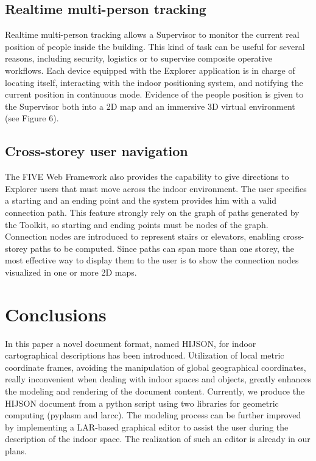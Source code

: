 \documentclass[]{egpubl}
\begin{document}
\subsection{Realtime multi-person tracking} Realtime multi-person tracking
allows a Supervisor to monitor the current real position of people inside the
building. This kind of task can be useful for several reasons, including
security, logistics or to supervise composite operative workflows. Each device
equipped with the Explorer application is in charge of locating itself,
interacting with the indoor positioning system, and notifying the current
position in continuous mode. Evidence of the people position is given to the
Supervisor both into a 2D map and an immersive 3D virtual environment (see
Figure 6).

\subsection{Cross-storey user navigation} The FIVE Web Framework also provides
the capability to give directions to Explorer users that must move across the
indoor environment. The user specifies a starting and an ending point and the
system provides him with a valid connection path. This feature strongly rely
on the graph of paths generated by the Toolkit, so starting and ending points
must be nodes of the graph. Connection nodes are introduced to represent
stairs or elevators, enabling cross-storey paths to be computed. Since paths
can span more than one storey, the most effective way to display them to the
user is to show the connection nodes visualized in one or more 2D maps.


\section{Conclusions}

In this paper a novel document format, named HIJSON, for indoor cartographical
descriptions has been introduced. Utilization of local metric coordinate
frames, avoiding the manipulation of global geographical coordinates, really
inconvenient when dealing with indoor spaces and objects, greatly enhances the
modeling and rendering of the document content. Currently, we produce the
HIJSON document from a python script using two libraries for geometric
computing (pyplasm and larcc). The modeling process can be further
improved by implementing a LAR-based graphical editor to assist the user
during the description of the indoor space. The realization of such an editor
is already in our plans. 
\end{document}
